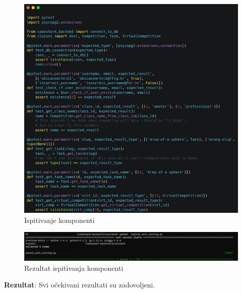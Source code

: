 			\begin{figure}[H]
				\includegraphics[width=\textwidth]{slike/IspitivanjeKomponenti.png} %
				\caption{Ispitivanje komponenti}
				\label{fig:IspitivanjeKomponenti} %
			\end{figure}
		
			\begin{figure}[H]
				\includegraphics[width=\textwidth]{slike/IspitivanjeKomponentiRez.png} %
				\caption{Rezultat ispitivanja komponenti}
				\label{fig:IspitivanjeKomponentiRez} %
			\end{figure}
		
			\noindent \textbf{Rezultat}: 
			\newline 
			Svi očekivani rezultati su zadovoljeni.
			
			
			
